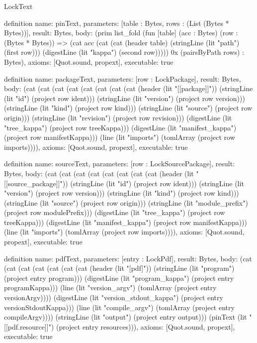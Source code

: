 \begin{lexlean}{LockText}
\begin{semanticmodule}
definition{
  name: pinText,
  parameters: [table : Bytes, rows : (List (Bytes * Bytes))],
  result: Bytes,
  body: (prim list_fold (fun [table] (acc : Bytes) (row : (Bytes * Bytes)) => (cat acc (cat (cat (header table) (stringLine (lit "path") (first row))) (digestLine (lit "kappa") (second row))))) 0x (pairsByPath rows) : Bytes),
  axioms: [Quot.sound, propext],
  executable: true
}

definition{
  name: packageText,
  parameters: [row : LockPackage],
  result: Bytes,
  body: (cat (cat (cat (cat (cat (cat (cat (cat (header (lit "[[package]]")) (stringLine (lit "id") (project row ident))) (stringLine (lit "version") (project row version))) (stringLine (lit "kind") (project row kind))) (stringLine (lit "source") (project row origin))) (stringLine (lit "revision") (project row revision))) (digestLine (lit "tree_kappa") (project row treeKappa))) (digestLine (lit "manifest_kappa") (project row manifestKappa))) (line (lit "imports") (tomlArray (project row imports)))),
  axioms: [Quot.sound, propext],
  executable: true
}

definition{
  name: sourceText,
  parameters: [row : LockSourcePackage],
  result: Bytes,
  body: (cat (cat (cat (cat (cat (cat (cat (cat (header (lit "[[source_package]]")) (stringLine (lit "id") (project row ident))) (stringLine (lit "version") (project row version))) (stringLine (lit "kind") (project row kind))) (stringLine (lit "source") (project row origin))) (stringLine (lit "module_prefix") (project row modulePrefix))) (digestLine (lit "tree_kappa") (project row treeKappa))) (digestLine (lit "manifest_kappa") (project row manifestKappa))) (line (lit "imports") (tomlArray (project row imports)))),
  axioms: [Quot.sound, propext],
  executable: true
}

definition{
  name: pdfText,
  parameters: [entry : LockPdf],
  result: Bytes,
  body: (cat (cat (cat (cat (cat (cat (cat (header (lit "[pdf]")) (stringLine (lit "program") (project entry program))) (digestLine (lit "program_kappa") (project entry programKappa))) (line (lit "version_argv") (tomlArray (project entry versionArgv)))) (digestLine (lit "version_stdout_kappa") (project entry versionStdoutKappa))) (line (lit "compile_argv") (tomlArray (project entry compileArgv)))) (stringLine (lit "output") (project entry output))) (pinText (lit "[[pdf.resource]]") (project entry resources))),
  axioms: [Quot.sound, propext],
  executable: true
}


\end{semanticmodule}
\end{lexlean}
